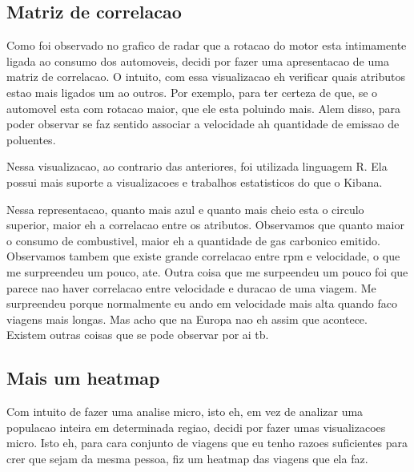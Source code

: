 \documentclass[10pt, conference]{IEEEtran}
\begin{document}










\subsection{Matriz de correlacao}

Como foi observado no grafico de radar que a rotacao do motor esta intimamente ligada
ao consumo dos automoveis, decidi por fazer uma apresentacao de uma matriz de correlacao. 
O intuito, com essa visualizacao eh verificar quais atributos estao mais ligados um ao
outros. Por exemplo, para ter certeza de que, se o automovel esta com rotacao maior, que
ele esta poluindo mais. Alem disso, para poder observar se faz sentido associar a 
velocidade ah quantidade de emissao de poluentes.

Nessa visualizacao, ao contrario das anteriores, foi utilizada linguagem R. Ela possui
mais suporte a visualizacoes e trabalhos estatisticos do que o Kibana. 

Nessa representacao, quanto mais azul e quanto mais cheio esta o circulo superior, maior
eh a correlacao entre os atributos. Observamos que quanto maior o consumo de combustivel,
maior eh a quantidade de gas carbonico emitido. Observamos tambem que existe grande
correlacao entre rpm e velocidade, o que me surpreendeu um pouco, ate. Outra coisa
que me surpeendeu um pouco foi que parece nao haver correlacao entre velocidade e duracao
de uma viagem. Me surpreendeu porque normalmente eu ando em velocidade mais alta quando
faco viagens mais longas. Mas acho que na Europa nao eh assim que acontece. Existem
outras coisas que se pode observar por ai tb.



\subsection{Mais um heatmap}

Com intuito de fazer uma analise micro, isto eh, em vez de analizar uma populacao inteira
em determinada regiao, decidi por fazer umas visualizacoes micro. Isto eh, para cara conjunto
de viagens que eu tenho razoes suficientes para crer que sejam da mesma pessoa, fiz um
heatmap das viagens que ela faz. 
\end{document}
